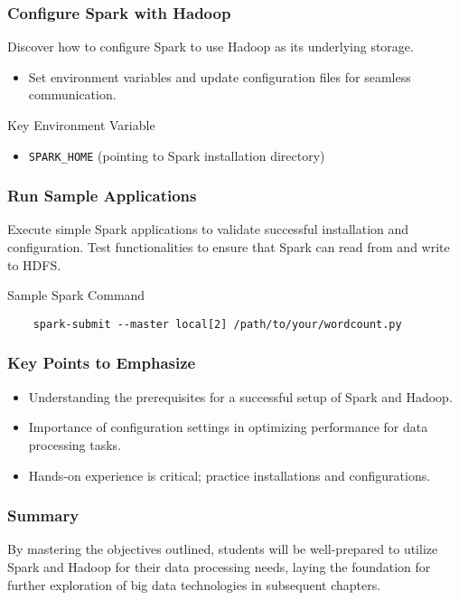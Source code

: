 \documentclass{beamer}
\begin{document}
\begin{frame}[fragile]
    \frametitle{Configure Spark with Hadoop}
    Discover how to configure Spark to use Hadoop as its underlying storage.

    \begin{itemize}
        \item Set environment variables and update configuration files for seamless communication.
    \end{itemize}

    \begin{block}{Key Environment Variable}
        \begin{itemize}
            \item \texttt{SPARK\_HOME} (pointing to Spark installation directory)
        \end{itemize}
    \end{block}
\end{frame}

\begin{frame}[fragile]
    \frametitle{Run Sample Applications}
    Execute simple Spark applications to validate successful installation and configuration. Test functionalities to ensure that Spark can read from and write to HDFS.

    \begin{block}{Sample Spark Command}
    \begin{lstlisting}
    spark-submit --master local[2] /path/to/your/wordcount.py
    \end{lstlisting}
    \end{block}
\end{frame}

\begin{frame}[fragile]
    \frametitle{Key Points to Emphasize}
    \begin{itemize}
        \item Understanding the prerequisites for a successful setup of Spark and Hadoop.
        \item Importance of configuration settings in optimizing performance for data processing tasks.
        \item Hands-on experience is critical; practice installations and configurations.
    \end{itemize}
\end{frame}

\begin{frame}[fragile]
    \frametitle{Summary}
    By mastering the objectives outlined, students will be well-prepared to utilize Spark and Hadoop for their data processing needs, laying the foundation for further exploration of big data technologies in subsequent chapters.
\end{frame}
\end{document}
